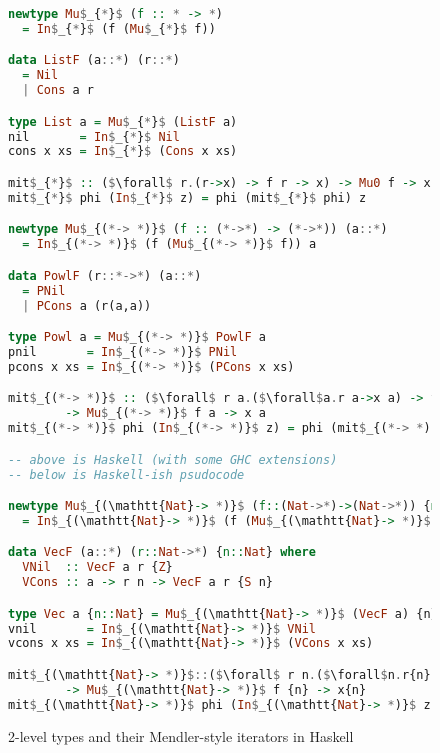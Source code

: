 \begin{figure}
\begin{lstlisting}[basicstyle={\ttfamily\small},language=Haskell,mathescape]
newtype Mu$_{*}$ (f :: * -> *)
  = In$_{*}$ (f (Mu$_{*}$ f))

data ListF (a::*) (r::*)
  = Nil
  | Cons a r

type List a = Mu$_{*}$ (ListF a)
nil       = In$_{*}$ Nil
cons x xs = In$_{*}$ (Cons x xs)

mit$_{*}$ :: ($\forall$ r.(r->x) -> f r -> x) -> Mu0 f -> x
mit$_{*}$ phi (In$_{*}$ z) = phi (mit$_{*}$ phi) z

newtype Mu$_{(*-> *)}$ (f :: (*->*) -> (*->*)) (a::*)
  = In$_{(*-> *)}$ (f (Mu$_{(*-> *)}$ f)) a

data PowlF (r::*->*) (a::*)
  = PNil
  | PCons a (r(a,a))

type Powl a = Mu$_{(*-> *)}$ PowlF a
pnil       = In$_{(*-> *)}$ PNil
pcons x xs = In$_{(*-> *)}$ (PCons x xs)

mit$_{(*-> *)}$ :: ($\forall$ r a.($\forall$a.r a->x a) -> f r a -> x a)
        -> Mu$_{(*-> *)}$ f a -> x a
mit$_{(*-> *)}$ phi (In$_{(*-> *)}$ z) = phi (mit$_{(*-> *)}$ phi) z

-- above is Haskell (with some GHC extensions)
-- below is Haskell-ish psudocode

newtype Mu$_{(\mathtt{Nat}-> *)}$ (f::(Nat->*)->(Nat->*)) {n::Nat}
  = In$_{(\mathtt{Nat}-> *)}$ (f (Mu$_{(\mathtt{Nat}-> *)}$ f)) {n}

data VecF (a::*) (r::Nat->*) {n::Nat} where
  VNil  :: VecF a r {Z}
  VCons :: a -> r n -> VecF a r {S n}

type Vec a {n::Nat} = Mu$_{(\mathtt{Nat}-> *)}$ (VecF a) {n}
vnil       = In$_{(\mathtt{Nat}-> *)}$ VNil
vcons x xs = In$_{(\mathtt{Nat}-> *)}$ (VCons x xs)

mit$_{(\mathtt{Nat}-> *)}$::($\forall$ r n.($\forall$n.r{n}->x{n})->f r {n}->x{n})
        -> Mu$_{(\mathtt{Nat}-> *)}$ f {n} -> x{n}
mit$_{(\mathtt{Nat}-> *)}$ phi (In$_{(\mathtt{Nat}-> *)}$ z) = phi (mit$_{(\mathtt{Nat}-> *)}$ phi) z
\end{lstlisting}
\caption{2-level types and their Mendler-style iterators in Haskell}
\label{fig:twoleveltypes}
\end{figure}
